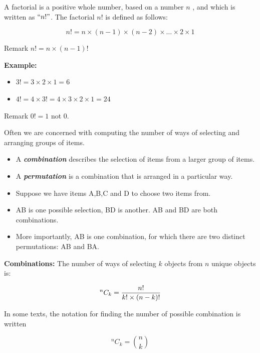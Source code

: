 \documentclass[12pt]{report}
\begin{document}
	{\Large
		
		A factorial is a positive whole number, based on a number $n$ , and which is written as $``n!"$. The factorial $n!$ is defined as follows:
		
		\[n!  =n \times (n-1) \times (n-2) \times \ldots \times 2 \times 1 \]
		
		Remark $n!  =n \times (n-1)!$\\ \bigskip
		
		\textbf{ Example: }
		
		\begin{itemize}
			\item $3!  = 3 \times 2  \times 1 = 6 $
			
			\item $4!  = 4 \times 3! = 4 \times 3 \times 2 \times 1 = 24$
		\end{itemize}
		Remark $0! = 1$ not $0$.
		
		
	}
	
	{\Large
		
		
		Often we are concerned with computing the number of ways of selecting and arranging groups of items. \begin{itemize} \item  A \textbf{\emph{combination}} describes the selection of items from a larger group of items.  \item A \textbf{\emph{permutation}} is a combination that is arranged in a particular way.
		\end{itemize}
		
		\bigskip
		\begin{itemize}
			\item Suppose we have items A,B,C and D to choose two items from.
			\item AB is one possible selection, BD is another. AB and BD are both combinations.
			\item More importantly, AB is one combination, for which there are two distinct permutations: AB and BA.
		\end{itemize}
	}
	
	{\Large
		
		\textbf{Combinations: }
		The number of ways of selecting $k$ objects from $n$ unique objects is:
		
		\[ ^n C_k = {n!  \over k! \times (n-k)!} \]
		
		In some texts, the notation for finding the number of possible combination is written
		
		\[ ^n C_k =  {n \choose k} \]
		
	}
	
\end{document}
